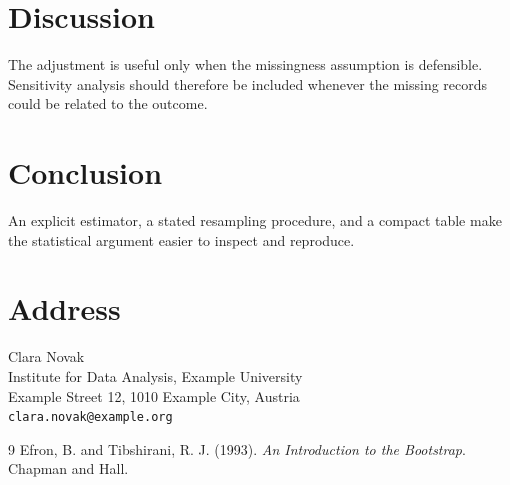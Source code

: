 \documentclass[11pt,a4paper]{article}
\begin{document}
\section{Discussion}
The adjustment is useful only when the missingness assumption is defensible.
Sensitivity analysis should therefore be included whenever the missing
records could be related to the outcome.

\section{Conclusion}
An explicit estimator, a stated resampling procedure, and a compact table
make the statistical argument easier to inspect and reproduce.

\section*{Address}
Clara Novak\\
Institute for Data Analysis, Example University\\
Example Street 12, 1010 Example City, Austria\\
\texttt{clara.novak@example.org}

\begin{thebibliography}{9}
Efron, B. and Tibshirani, R. J. (1993). \emph{An Introduction to the
Bootstrap}. Chapman and Hall.
\end{thebibliography}
\end{document}

